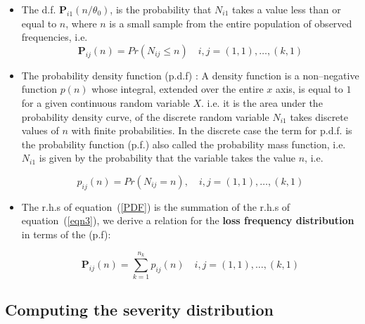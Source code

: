 \documentclass{DissertateUSU}
\begin{document}
\begin{itemize}
\item The d.f. \begin{math}\mathbf{P}_{i1}(n/\theta_0)  \end{math}, is the probability that $N_{i1}$ takes a value less than or equal to $n$, where $n$ is a small sample from the entire population of observed frequencies, i.e.
\singlespacing
\begin{equation}\label{PDF}
\mathbf{P}_{ij}(n)=Pr \left(N_{ij}\leq n \right) \quad{i,j}= (1,1),\ldots, (k,1)
\end{equation}
\doublespacing

\item The probability density function (p.d.f) : A density function is a non--negative function $p(n)$ whose integral, extended over the entire $x$ axis, is equal to $1$ for a given continuous random variable $X$. i.e. it is the area under the probability density curve, of the discrete random variable $N_{i1}$ takes discrete values of $n$ with finite probabilities. In the discrete case the term for p.d.f. is the probability function (p.f.) also called the probability mass function, i.e. $N_{i1}$ is given by the probability that the variable takes the value $n$, i.e.

\singlespacing
\begin{equation}\label{eqn3}
p_{ij}(n)=Pr\left(N_{ij} = n\right), \quad{i,j}= (1,1),\ldots, (k,1) 
\end{equation} 
\doublespacing

\item The r.h.s of equation~(\ref{PDF}) is the summation of the r.h.s of equation~(\ref{eqn3}), we derive a relation for the \textbf{loss frequency distribution} in terms of the (p.f): 

\singlespacing
\begin{equation}\label{eqn4} 
\mathbf{P}_{ij}(n)=\sum_{k=1}^{n_k} p_{ij}(n) \quad{i,j}= (1,1),\ldots, (k,1)
\end{equation}
\doublespacing

\end{itemize}

\subsection{Computing the severity distribution}
\end{document}
